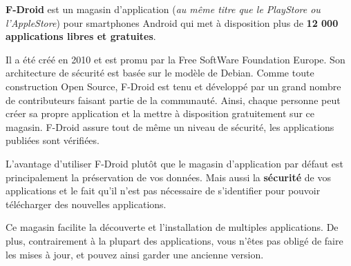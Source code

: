 \textbf{F-Droid} est un magasin d'application (\textit{au même titre que le
PlayStore ou l'AppleStore}) pour smartphones Android qui met à disposition plus
de \textbf{12 000 applications libres et gratuites}.

Il a été créé en 2010 et est promu par la Free SoftWare Foundation Europe. Son
architecture de sécurité est basée sur le modèle de Debian.
Comme toute construction Open Source, F-Droid est tenu et développé par un grand
nombre de contributeurs faisant partie de la communauté.
Ainsi, chaque personne peut créer sa propre application et la mettre à
disposition gratuitement sur ce magasin. F-Droid assure tout de même un niveau
de sécurité, les applications publiées sont vérifiées.\newline

L’avantage d'utiliser F-Droid plutôt que le magasin d'application par défaut est
principalement la préservation de vos données.
Mais aussi la \textbf{sécurité} de vos applications et le fait qu'il n'est pas
nécessaire de s'identifier pour pouvoir télécharger des nouvelles applications.

Ce magasin facilite la découverte et l'installation de multiples applications.
De plus, contrairement à la plupart des applications, vous n’êtes pas obligé de
faire les mises à jour, et pouvez ainsi garder une ancienne version.
